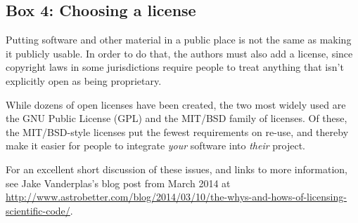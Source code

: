\subsection{Box 4: Choosing a license}

Putting software and other material in a public place is not the same
as making it publicly usable.  In order to do that, the authors must
also add a license, since copyright laws in some jurisdictions require
people to treat anything that isn't explicitly open as being
proprietary.

While dozens of open licenses have been created, the two most widely
used are the GNU Public License (GPL) and the MIT/BSD family of
licenses.  Of these, the MIT/BSD-style licenses put the fewest
requirements on re-use, and thereby make it easier for people to
integrate \emph{your} software into \emph{their} project.

For an excellent short discussion of these issues, and links to more
information, see Jake Vanderplas's blog post from March 2014 at
\href{http://www.astrobetter.com/blog/2014/03/10/the-whys-and-hows-of-licensing-scientific-code/}{http://www.astrobetter.com/blog/2014/03/10/the-whys-and-hows-of-licensing-scientific-code/}.
